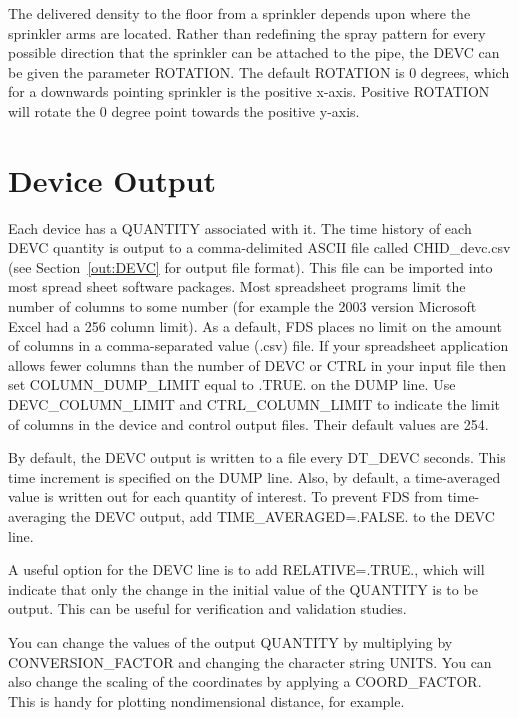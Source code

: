 \documentclass[11pt]{book}
\begin{document}
The delivered density to the floor from a sprinkler depends upon where the sprinkler arms are located.  Rather than redefining the spray pattern for every possible direction that the sprinkler can be attached to the pipe, the {\ct DEVC} can be given the parameter {\ct ROTATION}.  The default {\ct ROTATION} is 0 degrees, which for a downwards pointing sprinkler is the positive x-axis.  Positive {\ct ROTATION} will rotate the 0 degree point towards the positive y-axis.

\section{Device Output}
\label{info:out:DEVC}

Each device has a {\ct QUANTITY} associated with it. The time history of each {\ct DEVC} quantity is output to a comma-delimited ASCII file called {\ct CHID\_devc.csv} (see Section~\ref{out:DEVC} for output file format). This file can be imported into most spread sheet software packages.  Most spreadsheet programs limit the number of columns to some number (for example the 2003 version Microsoft Excel had a 256 column limit).  As a default, FDS places no limit on the amount of columns in a comma-separated value (.csv) file.  If your spreadsheet application allows fewer columns than the number of {\ct DEVC} or {\ct CTRL} in your input file then set {\ct COLUMN\_DUMP\_LIMIT} equal to {\ct .TRUE.} on the {\ct DUMP} line. Use {\ct DEVC\_COLUMN\_LIMIT} and {\ct CTRL\_COLUMN\_LIMIT} to indicate the limit of columns in the device and control output files. Their default values are 254.

By default, the {\ct DEVC} output is written to a file every {\ct DT\_DEVC} seconds. This time increment is specified on the {\ct DUMP} line. Also, by default, a time-averaged value is written out for each quantity of interest. To prevent FDS from time-averaging the {\ct DEVC} output, add {\ct TIME\_AVERAGED=.FALSE.} to the {\ct DEVC} line.

A useful option for the {\ct DEVC} line is to add {\ct RELATIVE=.TRUE.}, which will indicate that only the change in the initial value of the {\ct QUANTITY} is to be output. This can be useful for verification and validation studies.

You can change the values of the output {\ct QUANTITY} by multiplying by {\ct CONVERSION\_FACTOR} and changing the character string {\ct UNITS}.  You can also change the scaling of the coordinates by applying a {\ct COORD\_FACTOR}.  This is handy for plotting nondimensional distance, for example.
\end{document}
